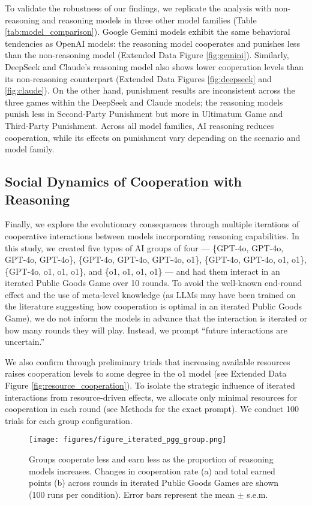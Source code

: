 To validate the robustness of our findings, we replicate the analysis with non-reasoning and reasoning models in three other model families (Table \ref{tab:model_comparison}).
Google Gemini models exhibit the same behavioral tendencies as OpenAI models: the reasoning model cooperates and punishes less than the non-reasoning model (Extended Data Figure \ref{fig:gemini}).
Similarly, DeepSeek and Claude's reasoning model also shows lower cooperation levels than its non-reasoning counterpart (Extended Data Figures \ref{fig:deepseek} and \ref{fig:claude}).
On the other hand, punishment results are inconsistent across the three games within the DeepSeek and Claude models; the reasoning models punish less in Second-Party Punishment but more in Ultimatum Game and Third-Party Punishment.
Across all model families, AI reasoning reduces cooperation, while its effects on punishment vary depending on the scenario and model family.

\subsection*{Social Dynamics of Cooperation with Reasoning}
Finally, we explore the evolutionary consequences through multiple iterations of cooperative interactions between models incorporating reasoning capabilities.
In this study, we created five types of AI groups of four --- \{GPT-4o, GPT-4o, GPT-4o, GPT-4o\}, \{GPT-4o, GPT-4o, GPT-4o, o1\}, \{GPT-4o, GPT-4o, o1, o1\}, \{GPT-4o, o1, o1, o1\}, and \{o1, o1, o1, o1\} --- and had them interact in an iterated Public Goods Game over 10 rounds.
To avoid the well-known end-round effect \cite{bo2005cooperation} and the use of meta-level knowledge (as LLMs may have been trained on the literature suggesting how cooperation is optimal in an iterated Public Goods Game), we do not inform the models in advance that the interaction is iterated or how many rounds they will play.
Instead, we prompt ``future interactions are uncertain.''

We also confirm through preliminary trials that increasing available resources raises cooperation levels to some degree in the o1 model (see Extended Data Figure \ref{fig:resource_cooperation}).
To isolate the strategic influence of iterated interactions from resource-driven effects, we allocate only minimal resources for cooperation in each round (see Methods for the exact prompt).
We conduct 100 trials for each group configuration.

\begin{figure}[ht]
  \centering 
  \texttt{[image: figures/figure\_iterated\_pgg\_group.png]}
  \caption{Groups cooperate less and earn less as the proportion of reasoning models increases. Changes in cooperation rate (a) and total earned points (b) across rounds in iterated Public Goods Games are shown (100 runs per condition). Error bars represent the mean $\pm$ s.e.m.}
  \label{fig:group_cooperation_dynamics}
\end{figure}


